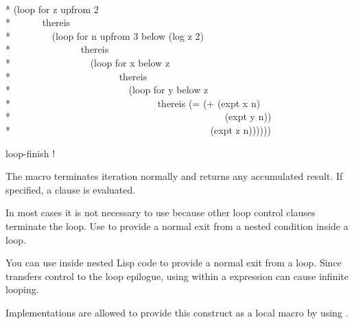 \begin{new}
\begin{defloop}
\begin{lisp}
 \\*
(loop for z upfrom 2 \\*
~~~~~~thereis \\*
~~~~~~~~(loop for n upfrom 3 below (log z 2) \\*
~~~~~~~~~~~~~~thereis \\*
~~~~~~~~~~~~~~~~(loop for x below z \\*
~~~~~~~~~~~~~~~~~~~~~~thereis \\*
~~~~~~~~~~~~~~~~~~~~~~~~(loop for y below z \\*
~~~~~~~~~~~~~~~~~~~~~~~~~~~~~~thereis (= (+ (expt x n) \\*
~~~~~~~~~~~~~~~~~~~~~~~~~~~~~~~~~~~~~~~~~~~~(expt y n)) \\*
~~~~~~~~~~~~~~~~~~~~~~~~~~~~~~~~~~~~~~~~~(expt z n))))))
\end{lisp}
\end{defloop}

\begin{defmac}
loop-finish \!!

The macro  terminates iteration normally
and returns any accumulated result.  If specified, a  clause
is evaluated.

In most cases it is not necessary to use 
because other loop control clauses terminate the loop.  
Use  to provide a normal exit
from a nested condition inside a loop.

You can use 
inside nested Lisp code to provide a normal exit from a loop.
Since  transfers control to the loop epilogue,
using  within a  expression can cause
infinite looping.


  Implementations are allowed to provide this construct as a local macro
  by using .


\end{defmac}
\end{new}
